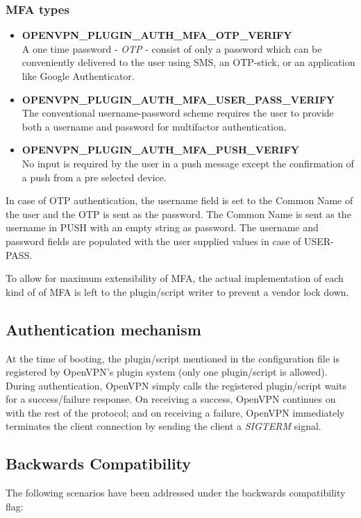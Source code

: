\documentclass[11pt,oneside]{book}
\begin{document}
\subsubsection{MFA types}
\begin{itemize}
    \item \textbf{OPENVPN\_PLUGIN\_AUTH\_MFA\_OTP\_VERIFY} \\
        A one time password - \emph{OTP} - consist of only a password which can be conveniently
        delivered to the user using SMS, an OTP-stick, or an application like Google Authenticator.
    \item \textbf{OPENVPN\_PLUGIN\_AUTH\_MFA\_USER\_PASS\_VERIFY} \\
        The conventional username-password scheme requires the user to provide
        both a username and password for multifactor authentication.
    \item \textbf{OPENVPN\_PLUGIN\_AUTH\_MFA\_PUSH\_VERIFY} \\
        No input is required by the user in a push message except the confirmation
        of a push from a pre selected device.
\end{itemize}

In case of OTP authentication, the username field is set to the Common Name of the user and the OTP
is sent as the password. The Common Name is sent as the username in PUSH with an empty string as
password. The username and password fields are populated with the user supplied values in case of
USER-PASS.

To allow for maximum extensibility of MFA, the actual implementation of each kind of of MFA
is left to the plugin/script writer to prevent a vendor lock down.

\subsection{Authentication mechanism}
\label{MFA:Mechanism}
At the time of booting, the plugin/script mentioned in the configuration file is registered
by OpenVPN's plugin system (only one plugin/script is allowed). During authentication, OpenVPN
simply calls the registered plugin/script waits for a success/failure response. On receiving a
success, OpenVPN continues on with the rest of the protocol; and on receiving a failure, OpenVPN
immediately terminates the client connection by sending the client a \emph{SIGTERM} signal.

\subsection{Backwards Compatibility}
The following scenarios have been addressed under the backwards compatibility flag:\\
\end{document}
